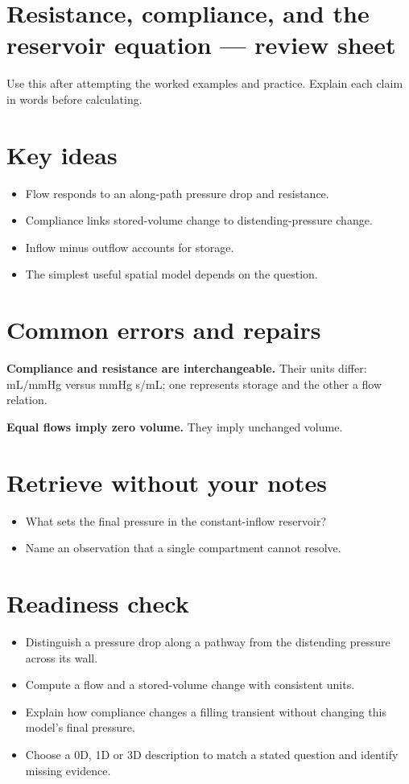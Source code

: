 \documentclass[11pt,letterpaper]{article}
\theoremstyle{definition}\newtheorem{definition}{Definition}\newtheorem{example}{Example}
\numberwithin{equation}{section}
\begin{document}
\section*{Resistance, compliance, and the reservoir equation --- review sheet}
Use this after attempting the worked examples and practice. Explain each claim in words before calculating.

\section*{Key ideas}
\begin{itemize}
\item Flow responds to an along-path pressure drop and resistance.
\item Compliance links stored-volume change to distending-pressure change.
\item Inflow minus outflow accounts for storage.
\item The simplest useful spatial model depends on the question.
\end{itemize}
\section*{Common errors and repairs}
\textbf{Compliance and resistance are interchangeable.} Their units differ: mL/mmHg versus mmHg s/mL; one represents storage and the other a flow relation.

\textbf{Equal flows imply zero volume.} They imply unchanged volume.

\section*{Retrieve without your notes}
\begin{itemize}
\item What sets the final pressure in the constant-inflow reservoir?
\item Name an observation that a single compartment cannot resolve.
\end{itemize}
\section*{Readiness check}
\begin{itemize}
\item Distinguish a pressure drop along a pathway from the distending pressure across its wall.
\item Compute a flow and a stored-volume change with consistent units.
\item Explain how compliance changes a filling transient without changing this model's final pressure.
\item Choose a 0D, 1D or 3D description to match a stated question and identify missing evidence.
\end{itemize}
\end{document}
